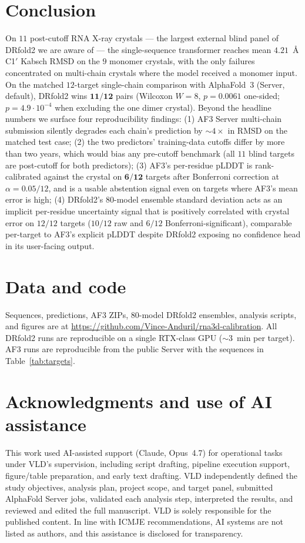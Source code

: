 \documentclass[11pt,a4paper]{article}
\begin{document}
\section{Conclusion}

On $11$ post-cutoff RNA X-ray crystals --- the largest external blind
panel of DRfold2 we are aware of --- the single-sequence transformer
reaches mean $4.21$~\AA{} C1$'$ Kabsch RMSD on the $9$ monomer
crystals, with the only failures concentrated on multi-chain
crystals where the model received a monomer input.
On the matched $12$-target single-chain comparison with AlphaFold~3
(Server, default), DRfold2 wins $\mathbf{11/12}$ pairs (Wilcoxon
$W=8$, $p=0.0061$ one-sided; $p=4.9\!\cdot\!10^{-4}$ when excluding
the one dimer crystal). Beyond the headline numbers we surface
four reproducibility findings: (1) AF3 Server multi-chain submission
silently degrades each chain's prediction by $\sim$$4\times$ in RMSD
on the matched test case; (2) the two predictors' training-data
cutoffs differ by more than two years, which would bias any
pre-cutoff benchmark (all $11$ blind targets are post-cutoff for
both predictors); (3) AF3's per-residue pLDDT is rank-calibrated
against the crystal on $\mathbf{6/12}$ targets after Bonferroni
correction at $\alpha=0.05/12$, and is a usable abstention signal
even on targets where AF3's mean error is high; (4) DRfold2's
$80$-model ensemble standard deviation acts as an implicit
per-residue uncertainty signal that is positively correlated
with crystal error on $12/12$ targets ($10/12$ raw and $6/12$
Bonferroni-significant), comparable per-target to AF3's explicit
pLDDT despite DRfold2 exposing no confidence head in its
user-facing output.

\section*{Data and code}
Sequences, predictions, AF3 ZIPs, $80$-model DRfold2 ensembles,
analysis scripts, and figures are at
\url{https://github.com/Vince-Anduril/rna3d-calibration}.
All DRfold2 runs are reproducible on a single RTX-class GPU
($\sim$3~min per target). AF3 runs are reproducible from the public
Server with the sequences in Table~\ref{tab:targets}.

\section*{Acknowledgments and use of AI assistance}
This work used AI-assisted support (Claude, Opus~4.7) for operational
tasks under VLD's supervision, including script drafting, pipeline
execution support, figure/table preparation, and early text drafting.
VLD independently defined the study objectives, analysis plan,
project scope, and target panel, submitted AlphaFold Server jobs,
validated each analysis step, interpreted the results, and reviewed
and edited the full manuscript. VLD is solely responsible for the
published content. In line with ICMJE recommendations, AI systems are
not listed as authors, and this assistance is disclosed for
transparency.
\end{document}
